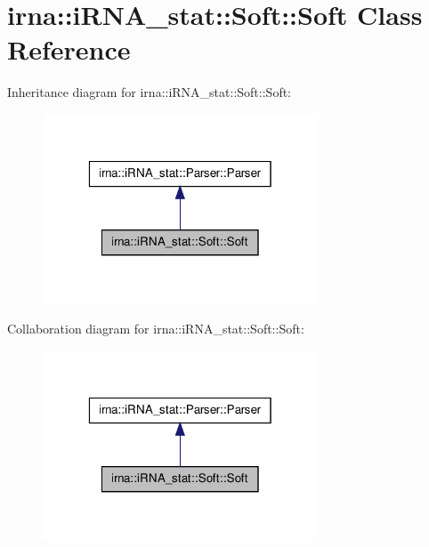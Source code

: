 \hypertarget{classirna_1_1iRNA__stat_1_1Soft_1_1Soft}{
\section{irna\-:\-:i\-R\-N\-A\-\_\-stat\-:\-:\-Soft\-:\-:\-Soft \-Class \-Reference}
\label{classirna_1_1iRNA__stat_1_1Soft_1_1Soft}
}


\-Inheritance diagram for irna\-:\-:i\-R\-N\-A\-\_\-stat\-:\-:\-Soft\-:\-:\-Soft\-:\nopagebreak
\begin{figure}[H]
\begin{center}
\leavevmode
\includegraphics[width=232pt]{classirna_1_1iRNA__stat_1_1Soft_1_1Soft__inherit__graph}
\end{center}
\end{figure}


\-Collaboration diagram for irna\-:\-:i\-R\-N\-A\-\_\-stat\-:\-:\-Soft\-:\-:\-Soft\-:\nopagebreak
\begin{figure}[H]
\begin{center}
\leavevmode
\includegraphics[width=232pt]{classirna_1_1iRNA__stat_1_1Soft_1_1Soft__coll__graph}
\end{center}
\end{figure}
